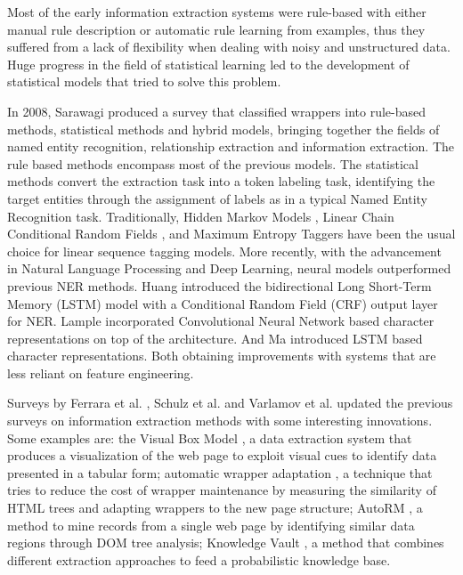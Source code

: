 \documentclass[sigconf]{acmart}
\begin{document}
Most of the early information extraction systems were rule-based with either 
manual rule description or automatic rule learning from examples, thus they
suffered from a lack of flexibility when dealing with noisy and unstructured data.
Huge progress in the field of statistical learning led to the development of
statistical models that tried to solve this problem.

In 2008, Sarawagi \cite{Sarawagi2008} produced a survey that classified wrappers into
rule-based methods, statistical methods and hybrid models, bringing together 
the fields of named entity recognition, relationship extraction and information extraction. 
The rule based methods encompass most of the 
previous models. The statistical methods convert the extraction task into a token labeling 
task, identifying the target entities through the assignment of labels as in a typical 
Named Entity Recognition task. Traditionally, Hidden Markov Models \cite{Leek1997, Freitag1999}, 
Linear Chain Conditional Random Fields \cite{Lafferty2001}, and Maximum Entropy Taggers 
\cite{McCallum2000} have been the usual choice for linear sequence tagging models.
More recently, with the advancement in Natural Language Processing and Deep Learning, 
neural models outperformed previous NER methods. Huang \cite{Huang2015} introduced the 
bidirectional Long Short-Term Memory (LSTM) model with a Conditional Random Field (CRF) output layer
for NER. Lample \cite{Lample2016} incorporated Convolutional Neural Network based character representations 
on top of the architecture. And Ma \cite{Ma2016} introduced
LSTM based character representations. Both obtaining improvements with systems that are less reliant
on feature engineering.

Surveys by Ferrara et al. \cite{Ferrara2014}, Schulz et al. \cite{Schulz2016} and 
Varlamov et al. \cite{Varlamov2016} updated the previous surveys on information 
extraction methods with some interesting innovations. 
Some examples are: the Visual Box Model \cite{Krupl2005}, a data extraction system that produces 
a visualization of the web page to exploit visual cues to identify data presented in a tabular form;
automatic wrapper adaptation \cite{Ferrara2011}, a technique that tries to reduce the cost of 
wrapper maintenance by measuring the similarity of HTML trees and adapting
wrappers to the new page structure; AutoRM \cite{Shi2015}, a method to mine
records from a single web page by identifying similar data regions through DOM
tree analysis; Knowledge Vault \cite{Dong2014}, a method that combines different 
extraction approaches to feed a probabilistic knowledge base.
\end{document}
